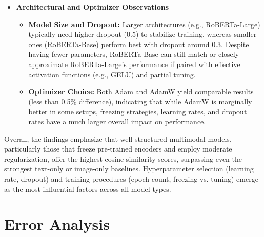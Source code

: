 \begin{itemize}
    \item \textbf{Architectural and Optimizer Observations}  
    \begin{itemize}
        \item \textbf{Model Size and Dropout:} Larger architectures (e.g., RoBERTa-Large) typically need higher dropout (0.5) to stabilize training, whereas smaller ones (RoBERTa-Base) perform best with dropout around 0.3. Despite having fewer parameters, RoBERTa-Base can still match or closely approximate RoBERTa-Large’s performance if paired with effective activation functions (e.g., GELU) and partial tuning.
        \item \textbf{Optimizer Choice:} Both Adam and AdamW yield comparable results (less than 0.5\% difference), indicating that while AdamW is marginally better in some setups, freezing strategies, learning rates, and dropout rates have a much larger overall impact on performance.
    \end{itemize}

\end{itemize}

Overall, the findings emphasize that well-structured multimodal models, particularly those that freeze pre-trained encoders and employ moderate regularization, offer the highest cosine similarity scores, surpassing even the strongest text-only or image-only baselines. Hyperparameter selection (learning rate, dropout) and training procedures (epoch count, freezing vs. tuning) emerge as the most influential factors across all model types.



\section{Error Analysis}
\label{sec:error-analysis}


